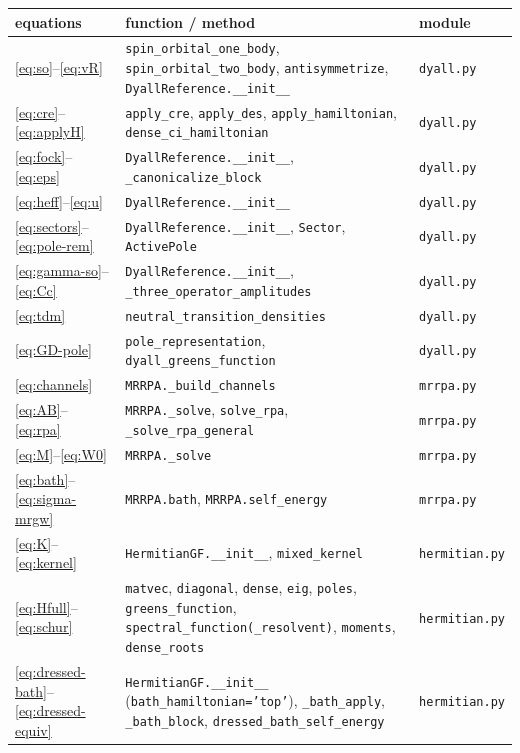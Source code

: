 \documentclass[11pt,a4paper]{article}
\newcommand{\code}[1]{\texttt{#1}}
\begin{document}
\begin{center}\small
\begin{tabular}{>{\raggedright\arraybackslash}p{4.0cm}>{\raggedright\arraybackslash}p{6.5cm}>{\raggedright\arraybackslash}p{4.5cm}}
\toprule
equations & function / method & module\\
\midrule
\eqref{eq:so}--\eqref{eq:vR} & \code{spin\_orbital\_one\_body}, \code{spin\_orbital\_two\_body}, \code{antisymmetrize}, \code{DyallReference.\_\_init\_\_} & \code{dyall.py}\\
\eqref{eq:cre}--\eqref{eq:applyH} & \code{apply\_cre}, \code{apply\_des}, \code{apply\_hamiltonian}, \code{dense\_ci\_hamiltonian} & \code{dyall.py}\\
\eqref{eq:fock}--\eqref{eq:eps} & \code{DyallReference.\_\_init\_\_}, \code{\_canonicalize\_block} & \code{dyall.py}\\
\eqref{eq:heff}--\eqref{eq:u} & \code{DyallReference.\_\_init\_\_} & \code{dyall.py}\\
\eqref{eq:sectors}--\eqref{eq:pole-rem} & \code{DyallReference.\_\_init\_\_}, \code{Sector}, \code{ActivePole} & \code{dyall.py}\\
\eqref{eq:gamma-so}--\eqref{eq:Cc} & \code{DyallReference.\_\_init\_\_}, \code{\_three\_operator\_amplitudes} & \code{dyall.py}\\
\eqref{eq:tdm} & \code{neutral\_transition\_densities} & \code{dyall.py}\\
\eqref{eq:GD-pole} & \code{pole\_representation}, \code{dyall\_greens\_function} & \code{dyall.py}\\
\eqref{eq:channels} & \code{MRRPA.\_build\_channels} & \code{mrrpa.py}\\
\eqref{eq:AB}--\eqref{eq:rpa} & \code{MRRPA.\_solve}, \code{solve\_rpa}, \code{\_solve\_rpa\_general} & \code{mrrpa.py}\\
\eqref{eq:M}--\eqref{eq:W0} & \code{MRRPA.\_solve} & \code{mrrpa.py}\\
\eqref{eq:bath}--\eqref{eq:sigma-mrgw} & \code{MRRPA.bath}, \code{MRRPA.self\_energy} & \code{mrrpa.py}\\
\eqref{eq:K}--\eqref{eq:kernel} & \code{HermitianGF.\_\_init\_\_}, \code{mixed\_kernel} & \code{hermitian.py}\\
\eqref{eq:Hfull}--\eqref{eq:schur} & \code{matvec}, \code{diagonal}, \code{dense}, \code{eig}, \code{poles}, \code{greens\_function}, \code{spectral\_function(\_resolvent)}, \code{moments}, \code{dense\_roots} & \code{hermitian.py}\\
\eqref{eq:dressed-bath}--\eqref{eq:dressed-equiv} & \code{HermitianGF.\_\_init\_\_} (\code{bath\_hamiltonian='top'}), \code{\_bath\_apply}, \code{\_bath\_block}, \code{dressed\_bath\_self\_energy} & \code{hermitian.py}\\

\end{tabular}
\end{center}
\end{document}
